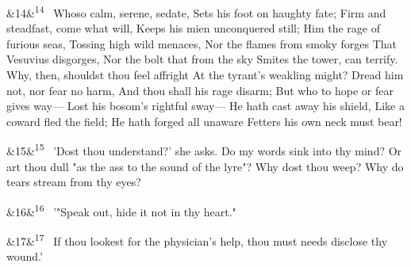 \documentclass[12pt]{article}
\newcommand{\para}[1][]{\par\noindent\ifx&#1&\else\textsuperscript{\footnotesize #1}~\fi}
\begin{document}
\para[14] Whoso calm, serene, sedate, Sets his foot on haughty fate; Firm and steadfast, come what will, Keeps his mien unconquered still; Him the rage of furious seas, Tossing high wild menaces, Nor the flames from smoky forges That Vesuvius disgorges, Nor the bolt that from the sky Smites the tower, can terrify. Why, then, shouldst thou feel affright At the tyrant's weakling might? Dread him not, nor fear no harm, And thou shall his rage disarm; But who to hope or fear gives way--- Lost his bosom's rightful sway--- He hath cast away his shield, Like a coward fled the field; He hath forged all unaware Fetters his own neck must bear!

\para[15] 'Dost thou understand?' she asks. Do my words sink into thy mind? Or art thou dull "as the ass to the sound of the lyre"? Why dost thou weep? Why do tears stream from thy eyes?

\para[16] '"Speak out, hide it not in thy heart."

\para[17] If thou lookest for the physician's help, thou must needs disclose thy wound.'
\end{document}
